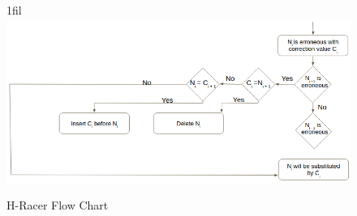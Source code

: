 \documentclass[12pt,openany]{llncs}
\makeatletter
\newcommand*{\centerfloat}{%
  \parindent \z@
  \leftskip \z@ \@plus 1fil \@minus \textwidth
  \rightskip\leftskip
  \parfillskip \z@skip}
\makeatother
\begin{document}
\begin{figure}
	\centerfloat
	\includegraphics[width=1.3\linewidth]{./figs/Second-Proposal-1}
	\caption{\label{fig:fig-Second-Proposal-1}H-Racer Flow Chart}
\end{figure}
\end{document}
